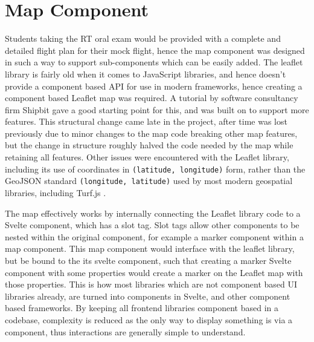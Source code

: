 
\section{Map Component}
\label{se:map}

Students taking the RT oral exam would be provided with a complete and detailed flight plan for their mock flight, hence the map component was designed in such a way to support sub-components which can be easily added. The leaflet library is fairly old when it comes to JavaScript libraries, and hence doesn't provide a component based API for use in modern frameworks, hence creating a component based Leaflet map was required. A tutorial by software consultancy firm Shipbit gave a good starting point for this, and was built on to support more features. This structural change came late in the project, after time was lost previously due to minor changes to the map code breaking other map features, but the change in structure roughly halved the code needed by the map while retaining all features. Other issues were encountered with the Leaflet library, including its use of coordinates in \texttt{(latitude, longitude)} form, rather than the GeoJSON standard \texttt{(longitude, latitude)} used by most modern geospatial libraries, including Turf.js \cite{GeoJSONRFC}.

The map effectively works by internally connecting the Leaflet library code to a Svelte component, which has a slot tag. Slot tags allow other components to be nested within the original component, for example a marker component within a map component. This map component would interface with the leaflet library, but be bound to the its svelte component, such that creating a marker Svelte component with some properties would create a marker on the Leaflet map with those properties. This is how most libraries which are not component based UI libraries already, are turned into components in Svelte, and other component based frameworks. By keeping all frontend libraries component based in a codebase, complexity is reduced as the only way to display something is via a component, thus interactions are generally simple to understand.

